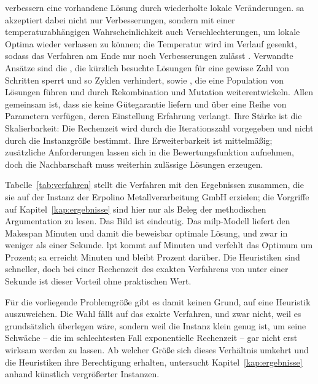  verbessern eine vorhandene Lösung durch wiederholte
lokale Veränderungen. \ac{sa} akzeptiert dabei nicht nur Verbesserungen, sondern
mit einer temperaturabhängigen Wahrscheinlichkeit auch Verschlechterungen, um
lokale Optima wieder verlassen zu können; die Temperatur wird im Verlauf gesenkt,
sodass das Verfahren am Ende nur noch Verbesserungen zulässt
\parencite{kirkpatrick1983optimization}. Verwandte Ansätze sind die
, die kürzlich besuchte Lösungen für eine gewisse Zahl von
Schritten sperrt und so Zyklen verhindert, sowie ,
die eine Population von Lösungen führen und durch Rekombination und Mutation
weiterentwickeln. Allen gemeinsam ist, dass sie keine Gütegarantie liefern und
über eine Reihe von Parametern verfügen, deren Einstellung Erfahrung verlangt.
Ihre Stärke ist die Skalierbarkeit: Die Rechenzeit wird durch die
Iterationszahl vorgegeben und nicht durch die Instanzgröße bestimmt. Ihre
Erweiterbarkeit ist mittelmäßig; zusätzliche Anforderungen lassen sich in die
Bewertungsfunktion aufnehmen, doch die Nachbarschaft muss weiterhin zulässige
Lösungen erzeugen.

\begin{table}[tb]
  \centering
  
  \caption[Vergleich der Verfahren]{Die untersuchten Verfahren auf der Instanz von Erpolino}
  \label{tab:verfahren}
\end{table}

Tabelle~\ref{tab:verfahren} stellt die Verfahren mit den Ergebnissen zusammen,
die sie auf der Instanz der Erpolino Metallverarbeitung GmbH erzielen; die
Vorgriffe auf Kapitel~\ref{kap:ergebnisse} sind hier nur als Beleg der
methodischen Argumentation zu lesen. Das Bild ist eindeutig. Das
\ac{milp}-Modell liefert den Makespan \Optimum{} Minuten und damit die
beweisbar optimale Lösung, und zwar in weniger als einer Sekunde. \ac{lpt}
kommt auf \MakespanLPT{} Minuten und verfehlt das Optimum um \AbstandLPT{}
Prozent; \ac{sa} erreicht \MakespanSA{} Minuten und bleibt \AbstandSA{} Prozent
darüber. Die Heuristiken sind schneller, doch bei einer Rechenzeit des exakten
Verfahrens von unter einer Sekunde ist dieser Vorteil ohne praktischen Wert.

Für die vorliegende Problemgröße gibt es damit keinen Grund, auf eine Heuristik
auszuweichen. Die Wahl fällt auf das exakte Verfahren, und zwar nicht, weil es
grundsätzlich überlegen wäre, sondern weil die Instanz klein genug ist, um seine
Schwäche -- die im schlechtesten Fall exponentielle Rechenzeit -- gar nicht erst
wirksam werden zu lassen. Ab welcher Größe sich dieses Verhältnis umkehrt und
die Heuristiken ihre Berechtigung erhalten, untersucht
Kapitel~\ref{kap:ergebnisse} anhand künstlich vergrößerter Instanzen.
